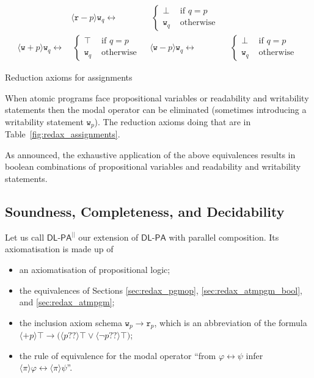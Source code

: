\documentclass{llncs}
\newcommand{\pll}{ {||} }							%
\newcommand{\readable}[1]{\mathtt{r}_{#1}}
\newcommand{\writable}[1]{\mathtt{w}_{#1}}
\newcommand{\testendo}{?\!\!?}			%
\newcommand{\Dlpa}{\ensuremath{\mathsf{DL\text{-}PA}}\xspace}
\newcommand{\DlpaPll}{\ensuremath{\mathsf{DL\text{-}PA}^\pll}\xspace}
\newcommand{\assgnbotR}[1]{{\mathtt r {-} #1}}
\newcommand{\assgntopW}[1]{{\mathtt w {+} #1}}
\newcommand{\assgnbotW}[1]{{\mathtt w {-} #1}}
\newcommand{\assgntopV}[1]{{\mathtt {+} #1}}
\newcommand{\assgnbotV}[1]{{\mathtt {-} #1}}
\newcommand{\ldia}[1]{ \big\langle #1 \big\rangle}
\newcommand{\leqv}{ \leftrightarrow }
\newcommand{\limp}{ \rightarrow }
\renewcommand{\phi}{\varphi}
\begin{document}
\begin{table}[t]
\begin{align*}
& \ldia{\assgnbotR p } \writable{q} \leqv &\ \begin{cases}
                \bot & \text{ if } q = p \\
                \writable{q} & \text{ otherwise } 
								\end{cases}
\\
\ldia{\assgntopW p } \writable{q} \leqv &\ \begin{cases}
								\top & \text{ if } q = p \\
								\writable{q} & \text{ otherwise }
								\end{cases}
& \ldia{\assgnbotW p } \writable{q} \leqv &\ \begin{cases}
								\bot & \text{ if } q = p \\
								\writable{q} & \text{ otherwise }
								\end{cases}
\end{align*}
\caption{Reduction axioms for assignments
\label{fig:redax_assignments}
}
\end{table}

When atomic programs face propositional variables or readability and writability statements 
then the modal operator can be eliminated (sometimes introducing a writability statement $\writable{p}$). 
The reduction axioms doing that are in Table~\ref{fig:redax_assignments}.

As announced, the exhaustive application of the above equivalences results in boolean combinations of 
propositional variables and readability and writability statements. 

\subsection{Soundness, Completeness, and Decidability} 

Let us call \DlpaPll our extension of \Dlpa with parallel composition. 
Its axiomatisation is made up of 
\begin{itemize}
\item
an axiomatisation of propositional logic;
\item
the equivalences of Sections \ref{sec:redax_pgmop}, 
\ref{sec:redax_atmpgm_bool}, 
and \ref{sec:redax_atmpgm};
\item
the inclusion axiom schema $\writable{p} \limp \readable p$, which is an abbreviation of the formula
$\ldia{ \assgntopV p } \top \limp \big( \ldia{ p \testendo} \top \lor \ldia{ \lnot p \testendo} \top \big) $;
\item
the rule of equivalence for the modal operator %
``from $\phi \leqv \psi$ infer $\ldia \pi \phi \leqv \ldia \pi \psi $''.
\end{itemize}
\end{document}
